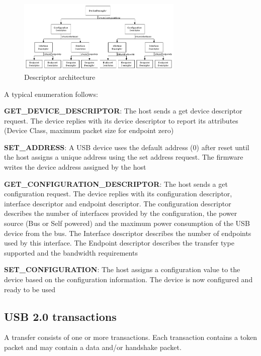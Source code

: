 \documentclass[pdftex,10pt,a4paper]{report}
\newenvironment{packed_item}{
\begin{itemize}
  \setlength{\itemsep}{1pt}
  \setlength{\parskip}{0pt}
  \setlength{\parsep}{0pt}
}{\end{itemize}}
\begin{document}
\begin{figure}[h!]
		\centering
		\includegraphics[width=0.7\textwidth]{./descr.jpg}
		\caption{Descriptor architecture}
		\label{Descriptor architecture}
\end{figure}

A typical enumeration follows:
\begin{packed_item}
	\item \textbf{GET\_DEVICE\_DESCRIPTOR}: The host sends a get device descriptor request. The device
replies with its device descriptor to report its attributes (Device Class, maximum packet size for endpoint zero)
	\item \textbf{SET\_ADDRESS}: A USB device uses the default address (0) after reset until the host assigns a unique address using the set address request. The firmware writes the device address assigned by the host
	\item \textbf{GET\_CONFIGURATION\_DESCRIPTOR}: The host sends a get configuration request. The device replies with its configuration descriptor, interface descriptor and endpoint descriptor. The configuration descriptor describes the number of interfaces provided by the configuration, the power source
(Bus or Self powered) and the maximum power consumption of the USB device from the bus.
The Interface descriptor describes the number of endpoints used by this interface. The Endpoint
descriptor describes the transfer type supported and the bandwidth requirements
	\item \textbf{SET\_CONFIGURATION}: The host assigns a configuration value to the device based on the
configuration information. The device is now configured and ready to be used
\end{packed_item}


\subsection{USB 2.0 transactions}
A transfer consists of one or more transactions. Each transaction contains a token packet and may contain a data and/or handshake packet.
\end{document}
